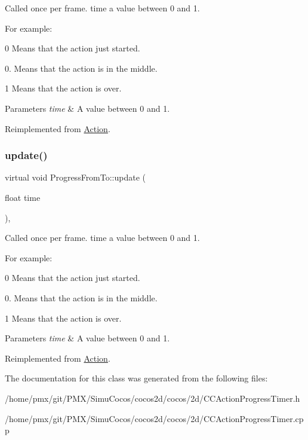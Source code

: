 Called once per frame. time a value between 0 and 1.

For example\+:
\begin{DoxyItemize}
\item 0 Means that the action just started.
\item 0. Means that the action is in the middle.
\item 1 Means that the action is over.
\end{DoxyItemize}


\begin{DoxyParams}{Parameters}
{\em time} & A value between 0 and 1. \\
\hline
\end{DoxyParams}


Reimplemented from \hyperlink{classAction_a937e646e63915e33ad05ba149bfcf239}{Action}.

\mbox{\label{classProgressFromTo_a138ddd6382f15b8e1b3e05a10bf2667d}} 
\subsubsection{\texorpdfstring{update()}{update()}\hspace{0.1cm}{\footnotesize\ttfamily [2/2]}}
{\footnotesize\ttfamily virtual void Progress\+From\+To\+::update (\begin{DoxyParamCaption}\item[{float}]{time }\end{DoxyParamCaption})\hspace{0.3cm}{\ttfamily [override]}, {\ttfamily [virtual]}}

Called once per frame. time a value between 0 and 1.

For example\+:
\begin{DoxyItemize}
\item 0 Means that the action just started.
\item 0. Means that the action is in the middle.
\item 1 Means that the action is over.
\end{DoxyItemize}


\begin{DoxyParams}{Parameters}
{\em time} & A value between 0 and 1. \\
\hline
\end{DoxyParams}


Reimplemented from \hyperlink{classAction_a937e646e63915e33ad05ba149bfcf239}{Action}.



The documentation for this class was generated from the following files\+:\begin{DoxyCompactItemize}
\item 
/home/pmx/git/\+P\+M\+X/\+Simu\+Cocos/cocos2d/cocos/2d/C\+C\+Action\+Progress\+Timer.\+h\item 
/home/pmx/git/\+P\+M\+X/\+Simu\+Cocos/cocos2d/cocos/2d/C\+C\+Action\+Progress\+Timer.\+cpp\end{DoxyCompactItemize}
